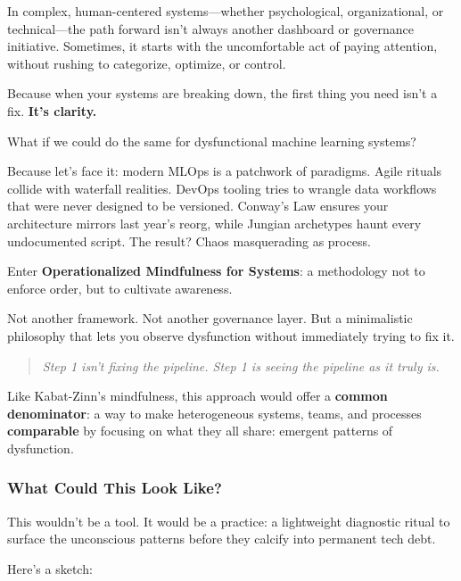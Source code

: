 In complex, human-centered systems—whether psychological, organizational, or technical—the path forward isn’t always another dashboard or governance initiative. Sometimes, it starts with the uncomfortable act of paying attention, without rushing to categorize, optimize, or control.

Because when your systems are breaking down, the first thing you need isn’t a fix.  \textbf{It’s clarity.}

What if we could do the same for dysfunctional machine learning systems?

Because let’s face it: modern MLOps is a patchwork of paradigms. Agile rituals collide with waterfall realities. DevOps tooling tries to wrangle data workflows that were never designed to be versioned. Conway’s Law ensures your architecture mirrors last year’s reorg, while Jungian archetypes haunt every undocumented script. The result? Chaos masquerading as process.

Enter \textbf{Operationalized Mindfulness for Systems}: a methodology not to enforce order, but to cultivate awareness.

Not another framework. Not another governance layer. But a minimalistic philosophy that lets you observe dysfunction without immediately trying to fix it.

\begin{quote}
\textit{Step 1 isn’t fixing the pipeline. Step 1 is seeing the pipeline as it truly is.}
\end{quote}

Like Kabat-Zinn’s mindfulness, this approach would offer a \textbf{common denominator}: a way to make heterogeneous systems, teams, and processes \textbf{comparable} by focusing on what they all share: emergent patterns of dysfunction.

\subsubsection{What Could This Look Like?}

This wouldn’t be a tool. It would be a practice: a lightweight diagnostic ritual to surface the unconscious patterns before they calcify into permanent tech debt.

Here’s a sketch:

